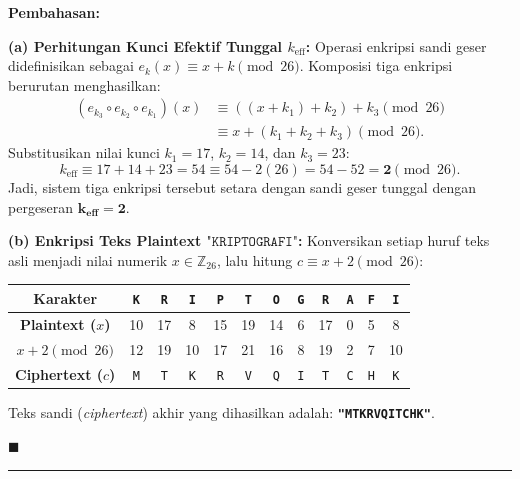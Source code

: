 \documentclass[11pt,a4paper]{article}
\newenvironment{solusi}{\noindent\textbf{\textsf{Pembahasan:}}\par\vspace{0.2em}}{\hfill$\blacksquare$\vspace{1em}\par\hrule\vspace{1em}}
\begin{document}
\begin{solusi}
\textbf{(a) Perhitungan Kunci Efektif Tunggal $k_{\text{eff}}$:}
Operasi enkripsi sandi geser didefinisikan sebagai $e_k(x) \equiv x + k \pmod{26}$. Komposisi tiga enkripsi berurutan menghasilkan:
\begin{align*}
(e_{k_3} \circ e_{k_2} \circ e_{k_1})(x) &\equiv ((x + k_1) + k_2) + k_3 \pmod{26} \\
&\equiv x + (k_1 + k_2 + k_3) \pmod{26}.
\end{align*}
Substitusikan nilai kunci $k_1 = 17$, $k_2 = 14$, dan $k_3 = 23$:
\[
k_{\text{eff}} \equiv 17 + 14 + 23 = 54 \equiv 54 - 2(26) = 54 - 52 = \mathbf{2} \pmod{26}.
\]
Jadi, sistem tiga enkripsi tersebut setara dengan sandi geser tunggal dengan pergeseran $\mathbf{k_{\text{eff}} = 2}$.

\vspace{0.2cm}
\textbf{(b) Enkripsi Teks Plaintext $\texttt{"KRIPTOGRAFI"}$:}
Konversikan setiap huruf teks asli menjadi nilai numerik $x \in \mathbb{Z}_{26}$, lalu hitung $c \equiv x + 2 \pmod{26}$:
\begin{center}
\begin{tabular}{c c c c c c c c c c c c}
\toprule
\textbf{Karakter} & \texttt{K} & \texttt{R} & \texttt{I} & \texttt{P} & \texttt{T} & \texttt{O} & \texttt{G} & \texttt{R} & \texttt{A} & \texttt{F} & \texttt{I} \\
\midrule
\textbf{Plaintext ($x$)} & 10 & 17 & 8 & 15 & 19 & 14 & 6 & 17 & 0 & 5 & 8 \\
\textbf{$x + 2 \pmod{26}$} & 12 & 19 & 10 & 17 & 21 & 16 & 8 & 19 & 2 & 7 & 10 \\
\textbf{Ciphertext ($c$)} & \texttt{M} & \texttt{T} & \texttt{K} & \texttt{R} & \texttt{V} & \texttt{Q} & \texttt{I} & \texttt{T} & \texttt{C} & \texttt{H} & \texttt{K} \\
\bottomrule
\end{tabular}
\end{center}
Teks sandi (\textit{ciphertext}) akhir yang dihasilkan adalah: \textbf{\texttt{"MTKRVQITCHK"}}.


\end{solusi}
\end{document}

